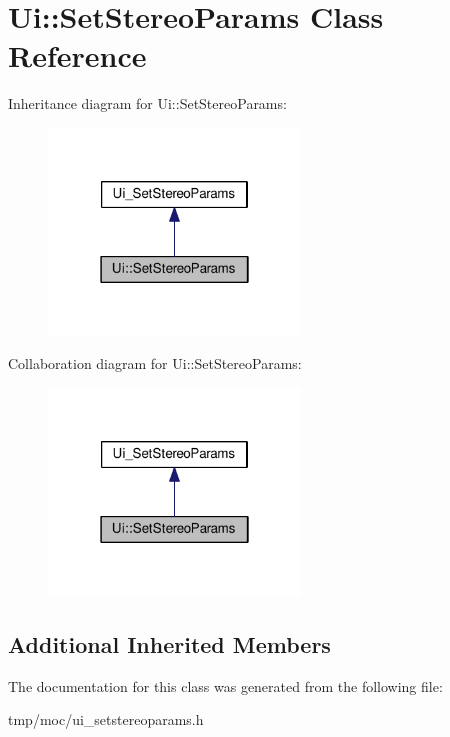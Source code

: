 \hypertarget{class_ui_1_1_set_stereo_params}{}\section{Ui\+:\+:Set\+Stereo\+Params Class Reference}
\label{class_ui_1_1_set_stereo_params}


Inheritance diagram for Ui\+:\+:Set\+Stereo\+Params\+:
\nopagebreak
\begin{figure}[H]
\begin{center}
\leavevmode
\includegraphics[width=190pt]{class_ui_1_1_set_stereo_params__inherit__graph}
\end{center}
\end{figure}


Collaboration diagram for Ui\+:\+:Set\+Stereo\+Params\+:
\nopagebreak
\begin{figure}[H]
\begin{center}
\leavevmode
\includegraphics[width=190pt]{class_ui_1_1_set_stereo_params__coll__graph}
\end{center}
\end{figure}
\subsection*{Additional Inherited Members}


The documentation for this class was generated from the following file\+:\begin{DoxyCompactItemize}
\item 
tmp/moc/ui\+\_\+setstereoparams.\+h\end{DoxyCompactItemize}
